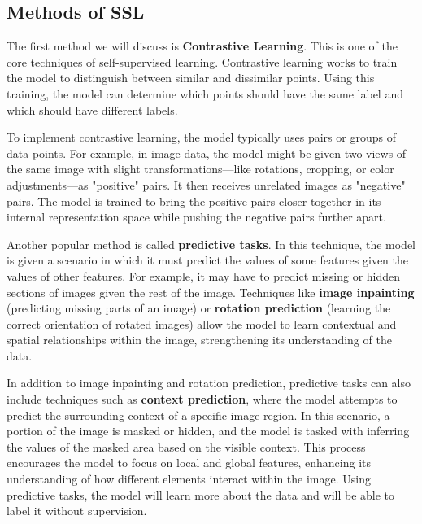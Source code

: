 \subsection{Methods of SSL}
\begin{flushleft}
    \large The first method we will discuss is \textbf{Contrastive Learning}. This is one of the core techniques of self-supervised learning. Contrastive learning works to train the model to distinguish between similar and dissimilar points. Using this training, the model can determine which points should have the same label and which should have different labels. \newline  
    
    To implement contrastive learning, the model typically uses pairs or groups of data points. For example, in image data, the model might be given two views of the same image with slight transformations—like rotations, cropping, or color adjustments—as "positive" pairs. It then receives unrelated images as "negative" pairs. The model is trained to bring the positive pairs closer together in its internal representation space while pushing the negative pairs further apart. \newline 

    Another popular method is called \textbf{predictive tasks}. In this technique, the model is given a scenario in which it must predict the values of some features given the values of other features. For example, it may have to predict missing or hidden sections of images given the rest of the image. Techniques like \textbf{image inpainting} (predicting missing parts of an image) or \textbf{rotation prediction} (learning the correct orientation of rotated images) allow the model to learn contextual and spatial relationships within the image, strengthening its understanding of the data.

    In addition to image inpainting and rotation prediction, predictive tasks can also include techniques such as \textbf{context prediction}, where the model attempts to predict the surrounding context of a specific image region. In this scenario, a portion of the image is masked or hidden, and the model is tasked with inferring the values of the masked area based on the visible context. This process encourages the model to focus on local and global features, enhancing its understanding of how different elements interact within the image. Using predictive tasks, the model will learn more about the data and will be able to label it without supervision.
\end{flushleft}
